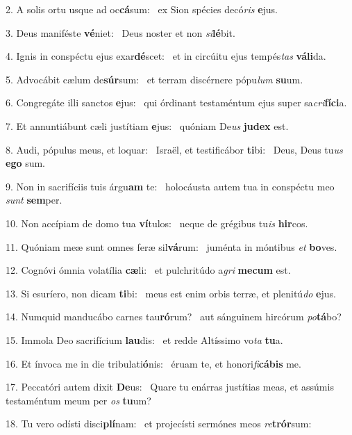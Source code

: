 2. A solis ortu usque ad oc\textbf{cá}sum: \ast\  ex Sion spécies decó\textit{ris} \textbf{e}jus.\

3. Deus maniféste \textbf{vé}niet: \ast\  Deus noster et non \textit{si}\textbf{lé}bit.\

4. Ignis in conspéctu ejus exar\textbf{dé}scet: \ast\  et in circúitu ejus tempés\textit{tas} \textbf{vá}\textbf{li}da.\

5. Advocábit cælum de\textbf{súr}sum: \ast\  et terram discérnere pópu\textit{lum} \textbf{su}um.\

6. Congregáte illi sanctos \textbf{e}jus: \ast\  qui órdinant testaméntum ejus super sa\textit{cri}\textbf{fí}\textbf{ci}a.\

7. Et annuntiábunt cæli justítiam \textbf{e}jus: \ast\  quóniam De\textit{us} \textbf{ju}\textbf{dex} est.\

8. Audi, pópulus meus, et loquar: \dag\  Israël, et testificábor \textbf{ti}bi: \ast\  Deus, Deus tu\textit{us} \textbf{e}\textbf{go} sum.\

9. Non in sacrifíciis tuis árgu\textbf{am} te: \ast\  holocáusta autem tua in conspéctu meo \textit{sunt} \textbf{sem}per.\

10. Non accípiam de domo tua \textbf{ví}tulos: \ast\  neque de grégibus tu\textit{is} \textbf{hir}cos.\

11. Quóniam meæ sunt omnes feræ sil\textbf{vá}rum: \ast\  juménta in móntibus \textit{et} \textbf{bo}ves.\

12. Cognóvi ómnia volatília \textbf{cæ}li: \ast\  et pulchritúdo a\textit{gri} \textbf{me}\textbf{cum} est.\

13. Si esuríero, non dicam \textbf{ti}bi: \ast\  meus est enim orbis terræ, et plenitú\textit{do} \textbf{e}jus.\

14. Numquid manducábo carnes tau\textbf{ró}rum? \ast\  aut sánguinem hircórum \textit{po}\textbf{tá}bo?\

15. Immola Deo sacrifícium \textbf{lau}dis: \ast\  et redde Altíssimo vo\textit{ta} \textbf{tu}a.\

16. Et ínvoca me in die tribulati\textbf{ó}nis: \ast\  éruam te, et honori\textit{fi}\textbf{cá}\textbf{bis} me.\

17. Peccatóri autem dixit \textbf{De}us: \ast\  Quare tu enárras justítias meas, et assúmis testaméntum meum per \textit{os} \textbf{tu}um?\

18. Tu vero odísti disci\textbf{plí}nam: \ast\  et projecísti sermónes meos \textit{re}\textbf{trór}sum:\

